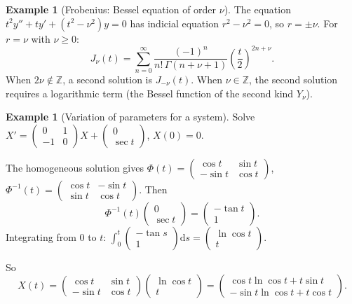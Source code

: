 \documentclass[12pt,a4paper,openany]{book}
\theoremstyle{definition}
\newtheorem{example}[definition]{Example}
\theoremstyle{plain}
\theoremstyle{remark}
\newcommand{\Z}{\mathbb{Z}}
\newcommand{\dd}{\mathrm{d}}
\begin{document}
\begin{example}[Frobenius: Bessel equation of order $\nu$]\label{ex:bessel-nu}
The equation $t^2y''+ty'+(t^2-\nu^2)y=0$ has indicial equation
$r^2-\nu^2=0$, so $r=\pm\nu$.  For $r=\nu$ with $\nu\ge 0$:
\[
  J_\nu(t) = \sum_{n=0}^{\infty}\frac{(-1)^n}{n!\,\Gamma(n+\nu+1)}
    \left(\frac{t}{2}\right)^{2n+\nu}.
\]
When $2\nu\notin\Z$, a second solution is $J_{-\nu}(t)$.
When $\nu\in\Z$, the second solution requires a logarithmic term
(the Bessel function of the second kind $Y_\nu$).
\end{example}

\begin{example}[Variation of parameters for a system]\label{ex:var-params-system}
Solve $X' = \begin{pmatrix}0&1\\-1&0\end{pmatrix}X
+ \begin{pmatrix}0\\\sec t\end{pmatrix}$, $X(0)=0$.

The homogeneous solution gives
$\Phi(t)=\begin{pmatrix}\cos t&\sin t\\-\sin t&\cos t\end{pmatrix}$,
$\Phi^{-1}(t)=\begin{pmatrix}\cos t&-\sin t\\\sin t&\cos t\end{pmatrix}$.
Then
\[
  \Phi^{-1}(t)\begin{pmatrix}0\\\sec t\end{pmatrix}
  = \begin{pmatrix}-\tan t\\1\end{pmatrix}.
\]
Integrating from $0$ to $t$:
$\int_0^t\begin{pmatrix}-\tan s\\1\end{pmatrix}\dd s
= \begin{pmatrix}\ln\cos t\\t\end{pmatrix}$.

So
\[
  X(t) = \begin{pmatrix}\cos t&\sin t\\-\sin t&\cos t\end{pmatrix}
  \begin{pmatrix}\ln\cos t\\t\end{pmatrix}
  = \begin{pmatrix}\cos t\ln\cos t+t\sin t\\
    -\sin t\ln\cos t+t\cos t\end{pmatrix}.
\]
\end{example}
\end{document}

